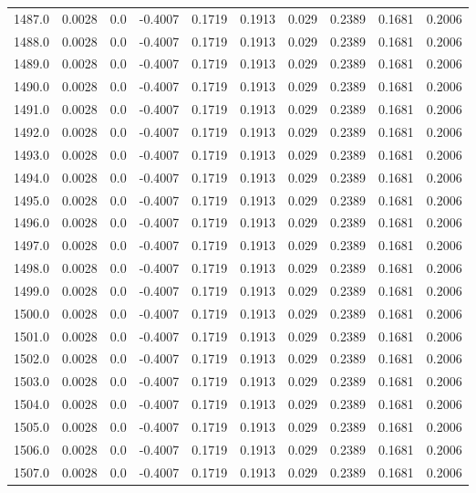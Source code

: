\begin{longtable}{lrrrrrrrrr}
1487.0 & 0.0028 & 0.0 & -0.4007 & 0.1719 & 0.1913 & 0.029 & 0.2389 & 0.1681 & 0.2006 \\
1488.0 & 0.0028 & 0.0 & -0.4007 & 0.1719 & 0.1913 & 0.029 & 0.2389 & 0.1681 & 0.2006 \\
1489.0 & 0.0028 & 0.0 & -0.4007 & 0.1719 & 0.1913 & 0.029 & 0.2389 & 0.1681 & 0.2006 \\
1490.0 & 0.0028 & 0.0 & -0.4007 & 0.1719 & 0.1913 & 0.029 & 0.2389 & 0.1681 & 0.2006 \\
1491.0 & 0.0028 & 0.0 & -0.4007 & 0.1719 & 0.1913 & 0.029 & 0.2389 & 0.1681 & 0.2006 \\
1492.0 & 0.0028 & 0.0 & -0.4007 & 0.1719 & 0.1913 & 0.029 & 0.2389 & 0.1681 & 0.2006 \\
1493.0 & 0.0028 & 0.0 & -0.4007 & 0.1719 & 0.1913 & 0.029 & 0.2389 & 0.1681 & 0.2006 \\
1494.0 & 0.0028 & 0.0 & -0.4007 & 0.1719 & 0.1913 & 0.029 & 0.2389 & 0.1681 & 0.2006 \\
1495.0 & 0.0028 & 0.0 & -0.4007 & 0.1719 & 0.1913 & 0.029 & 0.2389 & 0.1681 & 0.2006 \\
1496.0 & 0.0028 & 0.0 & -0.4007 & 0.1719 & 0.1913 & 0.029 & 0.2389 & 0.1681 & 0.2006 \\
1497.0 & 0.0028 & 0.0 & -0.4007 & 0.1719 & 0.1913 & 0.029 & 0.2389 & 0.1681 & 0.2006 \\
1498.0 & 0.0028 & 0.0 & -0.4007 & 0.1719 & 0.1913 & 0.029 & 0.2389 & 0.1681 & 0.2006 \\
1499.0 & 0.0028 & 0.0 & -0.4007 & 0.1719 & 0.1913 & 0.029 & 0.2389 & 0.1681 & 0.2006 \\
1500.0 & 0.0028 & 0.0 & -0.4007 & 0.1719 & 0.1913 & 0.029 & 0.2389 & 0.1681 & 0.2006 \\
1501.0 & 0.0028 & 0.0 & -0.4007 & 0.1719 & 0.1913 & 0.029 & 0.2389 & 0.1681 & 0.2006 \\
1502.0 & 0.0028 & 0.0 & -0.4007 & 0.1719 & 0.1913 & 0.029 & 0.2389 & 0.1681 & 0.2006 \\
1503.0 & 0.0028 & 0.0 & -0.4007 & 0.1719 & 0.1913 & 0.029 & 0.2389 & 0.1681 & 0.2006 \\
1504.0 & 0.0028 & 0.0 & -0.4007 & 0.1719 & 0.1913 & 0.029 & 0.2389 & 0.1681 & 0.2006 \\
1505.0 & 0.0028 & 0.0 & -0.4007 & 0.1719 & 0.1913 & 0.029 & 0.2389 & 0.1681 & 0.2006 \\
1506.0 & 0.0028 & 0.0 & -0.4007 & 0.1719 & 0.1913 & 0.029 & 0.2389 & 0.1681 & 0.2006 \\
1507.0 & 0.0028 & 0.0 & -0.4007 & 0.1719 & 0.1913 & 0.029 & 0.2389 & 0.1681 & 0.2006 \\

\end{longtable}
